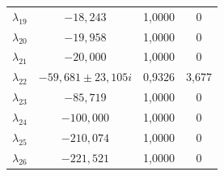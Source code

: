 \begin{longtable}{>{\centering\arraybackslash}m{1.5cm} c c c}
	$\lambda_{19}$ & $-18{,}243$                 & 1,0000 & 0 \\
	$\lambda_{20}$ & $-19{,}958$                 & 1,0000 & 0 \\
	$\lambda_{21}$ & $-20{,}000$                 & 1,0000 & 0 \\
	$\lambda_{22}$ & $-59{,}681 \pm 23{,}105i$   & 0,9326 & 3,677 \\
	$\lambda_{23}$ & $-85{,}719$                 & 1,0000 & 0 \\
	$\lambda_{24}$ & $-100{,}000$                & 1,0000 & 0 \\
	$\lambda_{25}$ & $-210{,}074$                & 1,0000 & 0 \\
	$\lambda_{26}$ & $-221{,}521$                & 1,0000 & 0 \\
\end{longtable}
\par
\endgroup

